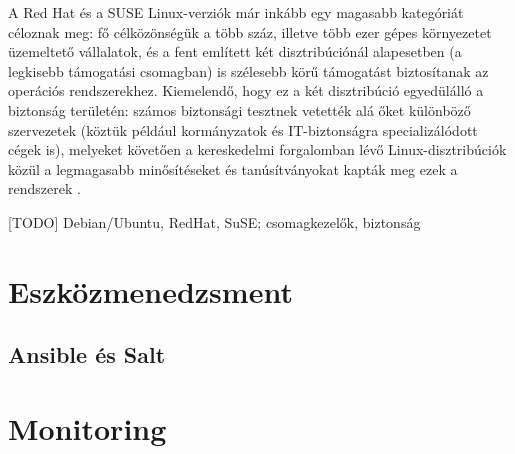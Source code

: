 A Red Hat és a SUSE Linux-verziók már inkább egy magasabb kategóriát céloznak meg: fő célközönségük a több száz, illetve több ezer gépes környezetet üzemeltető vállalatok, és a fent említett két disztribúciónál alapesetben (a legkisebb támogatási csomagban) is szélesebb körű támogatást biztosítanak az operációs rendszerekhez. Kiemelendő, hogy ez a két disztribúció egyedülálló a biztonság területén: számos biztonsági tesztnek vetették alá őket különböző szervezetek (köztük például kormányzatok és IT-biztonságra specializálódott cégek is), melyeket követően a kereskedelmi forgalomban lévő Linux-disztribúciók közül a legmagasabb minősítéseket és tanúsítványokat kapták meg ezek a rendszerek \cite{RhSec} \cite{SlesSec}.

[TODO] Debian/Ubuntu, RedHat, SuSE; csomagkezelők, biztonság

\section{Eszközmenedzsment}


\subsection{Ansible és Salt}

\section{Monitoring}